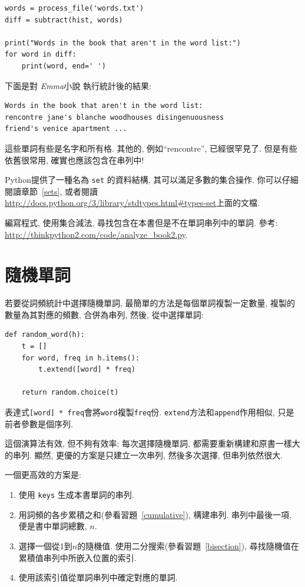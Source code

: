 \documentclass[10pt]{book}
\begin{document}
\begin{verbatim}
words = process_file('words.txt')
diff = subtract(hist, words)

print("Words in the book that aren't in the word list:")
for word in diff:
    print(word, end=' ')
\end{verbatim}
%
下面是對 {\em Emma}小說 執行統計後的結果:

\begin{verbatim}
Words in the book that aren't in the word list:
rencontre jane's blanche woodhouses disingenuousness 
friend's venice apartment ...
\end{verbatim}
%
這些單詞有些是名字和所有格. 其他的, 例如``rencontre'', 已經很罕見了. 
但是有些依舊很常用, 確實也應該包含在串列中!

\begin{exercise}

Python提供了一種名為 {\tt set} 的資料結構, 其可以滿足多數的集合操作. 
你可以仔細閱讀章節~\ref{sets}, 或者閱讀
\url{http://docs.python.org/3/library/stdtypes.html#types-set}上面的文檔. 

編寫程式, 使用集合減法, 尋找包含在本書但是不在單詞串列中的單詞. 
參考:
\url{http://thinkpython2.com/code/analyze_book2.py}.

\end{exercise}


\section{隨機單詞}
\label{randomwords}

若要從詞頻統計中選擇隨機單詞, 最簡單的方法是每個單詞複製一定數量, 
複製的數量為其對應的頻數, 合併為串列, 然後, 從中選擇單詞:

\begin{verbatim}
def random_word(h):
    t = []
    for word, freq in h.items():
        t.extend([word] * freq)

    return random.choice(t)
\end{verbatim}
%
表達式{\tt [word] * freq}會將{\tt word}複製{\tt freq}份. 
{\tt extend}方法和{\tt append}作用相似, 只是前者參數是個序列. 

這個演算法有效, 但不夠有效率; 每次選擇隨機單詞, 
都需要重新構建和原書一樣大的串列. 
顯然, 更優的方案是只建立一次串列, 然後多次選擇, 但串列依然很大.

一個更高效的方案是:

\begin{enumerate}

\item 使用 {\tt keys} 生成本書單詞的串列.

\item 用詞頻的各步累積之和(參看習題~\ref{cumulative}), 構建串列. 
串列中最後一項, 便是書中單詞總數, $n$. 
  
\item 選擇一個從1到$n$的隨機值. 使用二分搜索(參看習題~\ref{bisection}), 
尋找隨機值在累積值串列中所嵌入位置的索引. 

\item 使用該索引值從單詞串列中確定對應的單詞. 

\end{enumerate}
\end{document}
